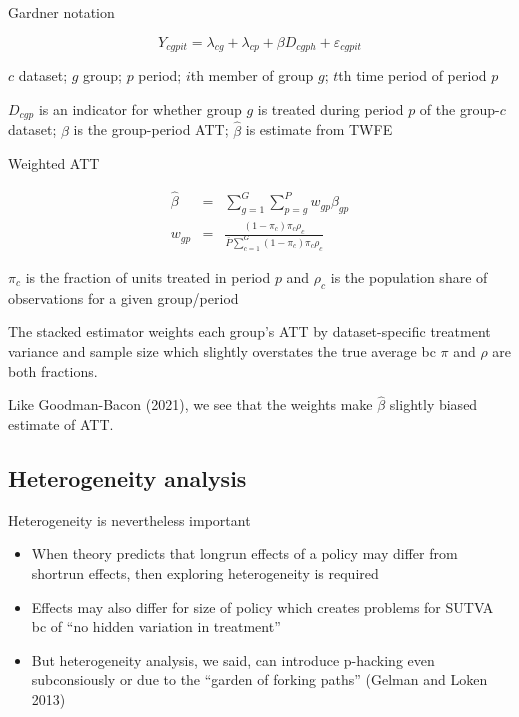 \documentclass{beamer}
\begin{document}
\begin{frame}{Gardner notation}

\begin{equation}
Y_{cgpit} = \lambda_{cg} + \lambda_{cp} + \beta D_{cgph} + \varepsilon_{cgpit}
\end{equation}

\bigskip

$c$ dataset; $g$ group; $p$ period; $i$th member of group $g$; $t$th time period of period $p$

\bigskip

$D_{cgp}$ is an indicator for whether group $g$ is treated during period $p$ of the group-$c$ dataset; $\beta$ is the group-period ATT; $\widehat{\beta}$ is estimate from TWFE

\end{frame}

\begin{frame}{Weighted ATT}

\begin{eqnarray*}
\widehat{\beta} &=& \sum_{g=1}^G \sum_{p=g}^P w_{gp} \beta_{gp} \\
w_{gp} &=& \frac{(1-\pi_c) \pi_c \rho_c}{\overline{P} \sum_{c=1}^G (1-\pi_c) \pi_c \rho_c}
\end{eqnarray*}

{\small
\bigskip

$\pi_c$ is the fraction of units treated in period $p$ and $\rho_c$ is the population share of observations for a given group/period

\bigskip

The stacked estimator weights each group's ATT by dataset-specific treatment variance and sample size which slightly overstates the true average bc $\pi$ and $\rho$ are both fractions.

\bigskip

Like Goodman-Bacon (2021), we see that the weights make $\widehat{\beta}$ slightly biased estimate of ATT. 
}

\end{frame}

\subsection{Heterogeneity analysis}




\begin{frame}{Heterogeneity is nevertheless important}

\begin{itemize}
\item When theory predicts that longrun effects of a policy may differ from shortrun effects, then exploring heterogeneity is required
\item Effects may also differ for size of policy which creates problems for SUTVA bc of ``no hidden variation in treatment''
\item But heterogeneity analysis, we said, can introduce p-hacking even subconsiously or due to the ``garden of forking paths'' (Gelman and Loken 2013)
\end{itemize}

\end{frame}
\end{document}
